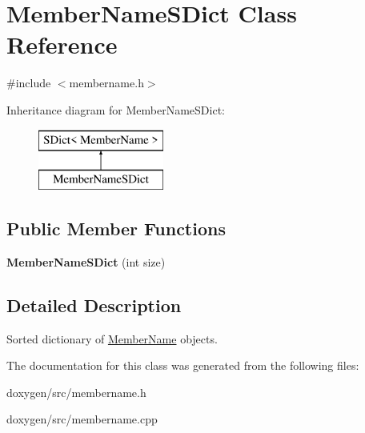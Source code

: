 \hypertarget{class_member_name_s_dict}{}\section{Member\+Name\+S\+Dict Class Reference}
\label{class_member_name_s_dict}


{\ttfamily \#include $<$membername.\+h$>$}

Inheritance diagram for Member\+Name\+S\+Dict\+:\begin{figure}[H]
\begin{center}
\leavevmode
\includegraphics[height=2.000000cm]{class_member_name_s_dict}
\end{center}
\end{figure}
\subsection*{Public Member Functions}
\begin{DoxyCompactItemize}
\item 
\mbox{\label{class_member_name_s_dict_a192639a58e288cd4357bf83cc44794aa}} 
{\bfseries Member\+Name\+S\+Dict} (int size)
\end{DoxyCompactItemize}


\subsection{Detailed Description}
Sorted dictionary of \mbox{\hyperlink{class_member_name}{Member\+Name}} objects. 

The documentation for this class was generated from the following files\+:\begin{DoxyCompactItemize}
\item 
doxygen/src/membername.\+h\item 
doxygen/src/membername.\+cpp\end{DoxyCompactItemize}
